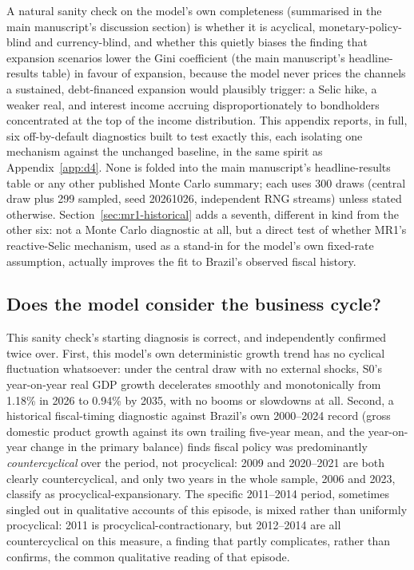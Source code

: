 \documentclass[11pt,a4paper]{article}
\begin{document}
\noindent A natural sanity check on the model's own completeness (summarised in the main manuscript's discussion section) is whether it is acyclical, monetary-policy-blind and currency-blind, and whether this quietly biases the finding that expansion scenarios lower the Gini coefficient (the main manuscript's headline-results table) in favour of expansion, because the model never prices the channels a sustained, debt-financed expansion would plausibly trigger: a Selic hike, a weaker real, and interest income accruing disproportionately to bondholders concentrated at the top of the income distribution. This appendix reports, in full, six off-by-default diagnostics built to test exactly this, each isolating one mechanism against the unchanged baseline, in the same spirit as Appendix~\ref{app:d4}. None is folded into the main manuscript's headline-results table or any other published Monte Carlo summary; each uses 300 draws (central draw plus 299 sampled, seed 20261026, independent RNG streams) unless stated otherwise. Section~\ref{sec:mr1-historical} adds a seventh, different in kind from the other six: not a Monte Carlo diagnostic at all, but a direct test of whether MR1's reactive-Selic mechanism, used as a stand-in for the model's own fixed-rate assumption, actually improves the fit to Brazil's observed fiscal history.

\subsection{Does the model consider the business cycle?}

This sanity check's starting diagnosis is correct, and independently confirmed twice over. First, this model's own deterministic growth trend has no cyclical fluctuation whatsoever: under the central draw with no external shocks, \textsc{S0}'s year-on-year real GDP growth decelerates smoothly and monotonically from 1.18\% in 2026 to 0.94\% by 2035, with no booms or slowdowns at all. Second, a historical fiscal-timing diagnostic against Brazil's own 2000--2024 record (gross domestic product growth against its own trailing five-year mean, and the year-on-year change in the primary balance) finds fiscal policy was predominantly \emph{countercyclical} over the period, not procyclical: 2009 and 2020--2021 are both clearly countercyclical, and only two years in the whole sample, 2006 and 2023, classify as procyclical-expansionary. The specific 2011--2014 period, sometimes singled out in qualitative accounts of this episode, is mixed rather than uniformly procyclical: 2011 is procyclical-contractionary, but 2012--2014 are all countercyclical on this measure, a finding that partly complicates, rather than confirms, the common qualitative reading of that episode.
\end{document}
